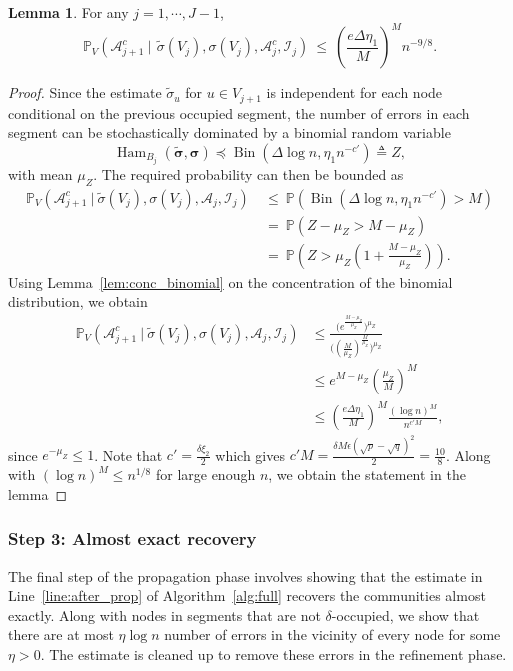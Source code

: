 \documentclass[letterpaper,11pt]{article}
\newtheorem{lem}[thm]{Lemma}
\theoremstyle{definition}
\def\P{\mathbb{P}}
\newcommand{\tsigma}{\tilde{\sigma}}
\newcommand{\bsigma}{\bm{\sigma}}
\newcommand{\tbsigma}{\tilde{\bsigma}}
\def\cA{\mathcal{A}}
\def\cI{\mathcal{I}}
\def\weq{ \ = \ }
\def\wle{ \ \le \ }
\newcommand{\Bin}{\operatorname{Bin}}
\numberwithin{equation}{section}
\newcommand{\eps}{\epsilon}
\newcommand{\Ham}{\operatorname{Ham}}
\newtheorem{lem}[thm]{Lemma}
\theoremstyle{definition}
\def\P{\mathbb{P}}
\newcommand{\tsigma}{\tilde{\sigma}}
\newcommand{\bsigma}{\bm{\sigma}}
\newcommand{\tbsigma}{\tilde{\bsigma}}
\def\cA{\mathcal{A}}
\def\cI{\mathcal{I}}
\def\weq{ \ = \ }
\def\wle{ \ \le \ }
\newcommand{\Bin}{\operatorname{Bin}}
\numberwithin{equation}{section}
\newcommand{\eps}{\epsilon}
\newcommand{\Ham}{\operatorname{Ham}}
\theoremstyle{thmstyletwo}%
\begin{document}
\begin{lem}
For any $j=1,\cdots,J-1$, 
\[
\P_V \left(
\cA_{j+1}^c
\ \Big| \
 \, \tilde{\sigma}(V_{j}),\sigma(V_j),\cA_j^c,\cI_j
\right)
\wle \left(\frac{e\Delta\eta_1}{M}\right)^M  n^{-9/8}.
\]


\label{lem:Hamming}
\end{lem}
\begin{proof}
Since the estimate $\tsigma_u$ for $ u\in V_{j+1}$ is independent for each node conditional on the previous occupied segment, the number of errors in each segment can be stochastically dominated by a binomial random variable 
\[
 \Ham_{B_j}(\tbsigma,\bsigma)
 \preccurlyeq \Bin(\Delta \log n,\eta_1 n^{-c'})
 \triangleq Z,
\]
with mean $\mu_Z$. The required probability can then be bounded as 
\begin{align*}
 \P_V\left(\cA_{j+1}^c \ \big|\ \tilde{\sigma}(V_{j}), \sigma(V_j), \cA_{j} ,\cI_j\right) 
 &\wle \P(\Bin(\Delta \log n,\eta_1 n^{-c'})> M )\\
 &\weq \P(Z-\mu_Z > M-\mu_Z)\\
 &\weq \P\left(Z > \mu_Z\left(1+\frac{M-\mu_Z}{\mu_Z}\right)\right).
\end{align*}
Using Lemma~\ref{lem:conc_binomial} on the concentration of the binomial distribution, we obtain
\begin{align*}
 \P_V\left(\cA_{j+1}^c \ \big|\ \tilde{\sigma}(V_{j}) ,\sigma(V_j) , \cA_{j},\cI_j\right)
 &\le \frac{\big(e^{\frac{M-\mu_Z}{\mu_Z}}\big)^{\mu_Z}}{\bigg(\left(\frac{M}{\mu_Z}\right)^{\frac{M}{\mu_Z}}\bigg)^{\mu_Z}}\\
 &\le e^{M-\mu_Z} \left(\frac{\mu_Z}{M}\right)^M\\
 &\le \left(\frac{e\Delta\eta_1}{M}\right)^M \frac{(\log n)^M}{n^{c'M}},
\end{align*}
since $e^{-\mu_Z} \le 1$.
Note that $c'= \frac{\delta \xi_2}{2}$ which gives $c'M = \frac{\delta M \eps (\sqrt{p}-\sqrt{q})^2}{2} = \frac{10}{8}$. Along with $(\log n)^M \le n^{1/8}$ for large enough $n$, we obtain the statement in the lemma
\end{proof}

\subsubsection{Step 3: Almost exact recovery}
The final step of the propagation phase involves showing that the estimate in Line~\ref{line:after_prop} of Algorithm~\ref{alg:full} recovers the communities almost exactly. Along with nodes in segments that are not $\delta$-occupied, we show that there are at most $\eta \log n$ number of errors in the vicinity of every node for some $\eta>0$. The estimate is cleaned up to remove these errors in the refinement phase.
\end{document}
